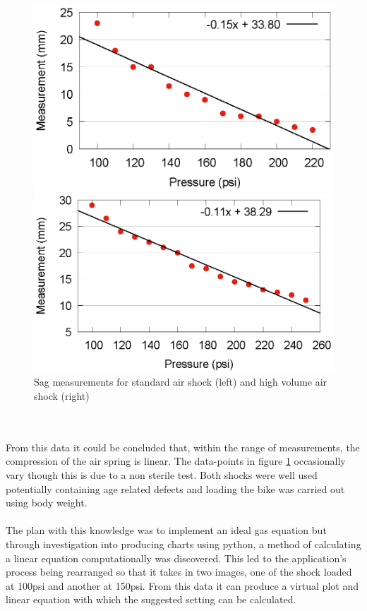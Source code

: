 		\begin{figure}[h!]
			\centering
			\begin{minipage}{0.4\textwidth}
				\centering
				\includegraphics[width=\textwidth]{../images/results/fox_scatter.eps}
			\end{minipage}
			\begin{minipage}{0.4\textwidth}
				\centering
				\includegraphics[width=\textwidth]{../images/results/rs_scatter.eps}
			\end{minipage}
			\caption{Sag measurements for standard air shock (left) and high volume air shock (right)}
			\label{fig:scatters}
		\end{figure}\\\\
		From this data it could be concluded that, within the range of measurements, the compression of the air spring is linear. The data-points in figure \ref{fig:scatters} occasionally vary though this is due to a non sterile test. Both shocks were well used potentially containing age related defects and loading the bike was carried out using body weight.
		\\\\
		The plan with this knowledge was to implement an ideal gas equation but through investigation into producing charts using python, a method of calculating a linear equation computationally was discovered. This led to the application's process being rearranged so that it takes in two images, one of the shock loaded at 100psi and another at 150psi. From this data it can produce a virtual plot and linear equation with which the suggested setting can be calculated.
